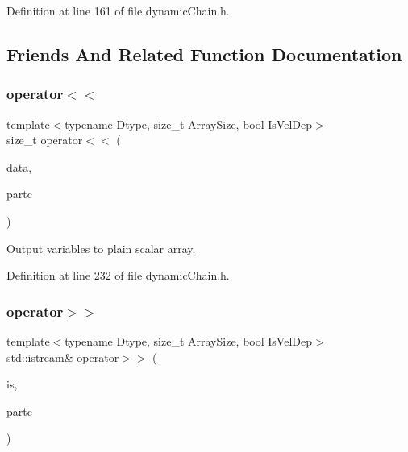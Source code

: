 Definition at line 161 of file dynamic\+Chain.\+h.



\subsection{Friends And Related Function Documentation}
\mbox{\label{class_vel_dep_chain_particles_a6544571a675616104a236ad0b4504a73}} 
\subsubsection{\texorpdfstring{operator$<$$<$}{operator<<}}
{\footnotesize\ttfamily template$<$typename Dtype, size\+\_\+t Array\+Size, bool Is\+Vel\+Dep$>$ \\
size\+\_\+t operator$<$$<$ (\begin{DoxyParamCaption}\item[{\mbox{\hyperlink{class_vel_indep_particles_a6bba8ac3f941a144214037a27ccaa119}{Dyn\+Scalar\+Array}} \&}]{data,  }\item[{const \mbox{\hyperlink{class_vel_dep_chain_particles}{Vel\+Dep\+Chain\+Particles}}$<$ Dtype, Array\+Size, Is\+Vel\+Dep $>$ \&}]{partc }\end{DoxyParamCaption})\hspace{0.3cm}{\ttfamily [friend]}}



Output variables to plain scalar array. 



Definition at line 232 of file dynamic\+Chain.\+h.

\mbox{\label{class_vel_dep_chain_particles_aa49e7bdbd28850629b79699eadb04d9c}} 
\subsubsection{\texorpdfstring{operator$>$$>$}{operator>>}\hspace{0.1cm}{\footnotesize\ttfamily [1/2]}}
{\footnotesize\ttfamily template$<$typename Dtype, size\+\_\+t Array\+Size, bool Is\+Vel\+Dep$>$ \\
std\+::istream\& operator$>$$>$ (\begin{DoxyParamCaption}\item[{std\+::istream \&}]{is,  }\item[{\mbox{\hyperlink{class_vel_dep_chain_particles}{Vel\+Dep\+Chain\+Particles}}$<$ Dtype, Array\+Size, Is\+Vel\+Dep $>$ \&}]{partc }\end{DoxyParamCaption})\hspace{0.3cm}{\ttfamily [friend]}}



